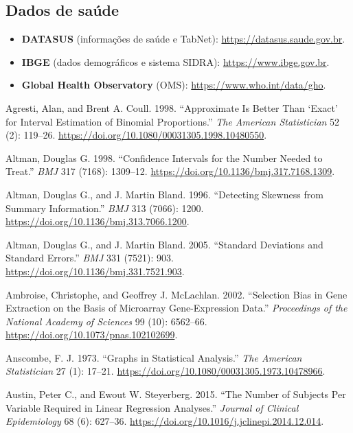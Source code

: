 \documentclass[
]{book}
\newlength{\cslhangindent}
\newenvironment{CSLReferences}[2] %
 {\begin{list}{}{%
  \setlength{\itemindent}{0pt}
  \setlength{\leftmargin}{0pt}
  \setlength{\parsep}{0pt}
  \ifodd #1
   \setlength{\leftmargin}{\cslhangindent}
   \setlength{\itemindent}{-1\cslhangindent}
  \fi
  \setlength{\itemsep}{#2\baselineskip}}}
 {\end{list}}
\providecommand{\tightlist}{%
  \setlength{\itemsep}{0pt}\setlength{\parskip}{0pt}}
\begin{document}
\subsection{Dados de saúde}\label{dados-de-sauxfade}

\begin{itemize}
\tightlist
\item
  \textbf{DATASUS} (informações de saúde e TabNet): \url{https://datasus.saude.gov.br}.
\item
  \textbf{IBGE} (dados demográficos e sistema SIDRA): \url{https://www.ibge.gov.br}.
\item
  \textbf{Global Health Observatory} (OMS): \url{https://www.who.int/data/gho}.
\end{itemize}

\protect{}\label{refs}
\begin{CSLReferences}{1}{1}
Agresti, Alan, and Brent A. Coull. 1998. {``Approximate Is Better Than {`Exact'} for Interval Estimation of Binomial Proportions.''} \emph{The American Statistician} 52 (2): 119--26. \url{https://doi.org/10.1080/00031305.1998.10480550}.

Altman, Douglas G. 1998. {``Confidence Intervals for the Number Needed to Treat.''} \emph{BMJ} 317 (7168): 1309--12. \url{https://doi.org/10.1136/bmj.317.7168.1309}.

Altman, Douglas G., and J. Martin Bland. 1996. {``Detecting Skewness from Summary Information.''} \emph{BMJ} 313 (7066): 1200. \url{https://doi.org/10.1136/bmj.313.7066.1200}.

Altman, Douglas G., and J. Martin Bland. 2005. {``Standard Deviations and Standard Errors.''} \emph{BMJ} 331 (7521): 903. \url{https://doi.org/10.1136/bmj.331.7521.903}.

Ambroise, Christophe, and Geoffrey J. McLachlan. 2002. {``Selection Bias in Gene Extraction on the Basis of Microarray Gene-Expression Data.''} \emph{Proceedings of the National Academy of Sciences} 99 (10): 6562--66. \url{https://doi.org/10.1073/pnas.102102699}.

Anscombe, F. J. 1973. {``Graphs in Statistical Analysis.''} \emph{The American Statistician} 27 (1): 17--21. \url{https://doi.org/10.1080/00031305.1973.10478966}.

Austin, Peter C., and Ewout W. Steyerberg. 2015. {``The Number of Subjects Per Variable Required in Linear Regression Analyses.''} \emph{Journal of Clinical Epidemiology} 68 (6): 627--36. \url{https://doi.org/10.1016/j.jclinepi.2014.12.014}.


\end{CSLReferences}
\end{document}
